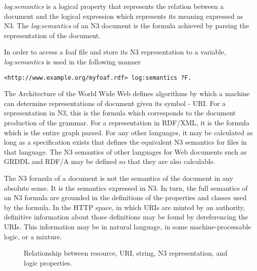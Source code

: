 \documentclass{tlp}
\begin{document}
{\it log:semantics} is a logical property that represents the relation
between a document and the logical expression which represents its
meaning expressed as N3. The {\it log:semantics} of an N3 document is
the formula achieved by parsing the representation of the document.

In order to access a foaf file and store its N3 representation to a
variable, {\it log:semantics} is used in the following manner

\begin{verbatim}
<http://www.example.org/myfoaf.rdf> log:semantics ?F. 
\end{verbatim}

The Architecture of the World Wide Web defines algorithms by which a
machine can determine representations of document given its symbol -
URI.  For a representation in N3, this is the formula which
corresponds to the document production of the grammar.  For a
representation in RDF/XML, it is the formula which is the entire graph
parsed.  For any other languages, it may be calculated as long as a
specification exists that defines the equivalent N3 semantics for
files in that language. The N3 semantics of other languages for Web
documents such as GRDDL \cite{grddl} and RDF/A \cite{rdfa} may be
defined so that they are also calculable.

The N3 formula of a document is not the semantics of the document in
any absolute sense.  It is the semantics expressed in N3.  In turn,
the full semantics of an N3 formula are grounded in the definitions of
the properties and classes used by the formula.  In the HTTP space, in
which URIs are minted by an authority, definitive information about
those definitions may be found by dereferencing the URIs. This
information may be in natural language, in some machine-processable
logic, or a mixture.  


\begin{figure}[tb]
  \centerline{}
  \caption{Relationship between resource, URI, string, N3
    representation, and logic properties.}
  \label{relationship}
\end{figure}
\end{document}
